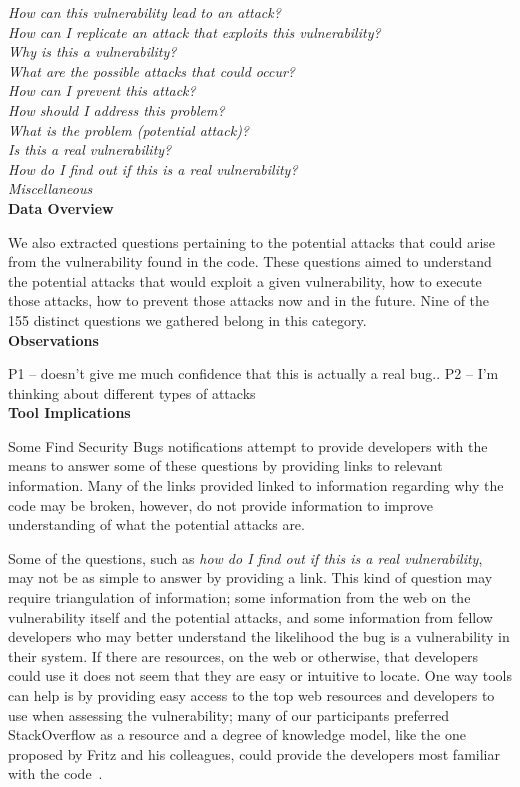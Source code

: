 \documentclass[conference]{IEEEtran}
\begin{document}
\noindent\emph{How can this vulnerability lead to an attack?} \\
\emph{How can I replicate an attack that exploits this vulnerability?} \\
\emph{Why is this a vulnerability?} \\
\emph{What are the possible attacks that could occur?} \\
\emph{How can I prevent this attack?} \\
\emph{How should I address this problem? } \\
\emph{What is the problem (potential attack)?} \\
\emph{Is this a real vulnerability?} \\
\emph{How do I find out if this is a real vulnerability?} \\
\emph{Miscellaneous} \\

\noindent\textbf{Data Overview}

We also extracted questions pertaining to the potential attacks that could arise from the vulnerability found in the code. 
These questions aimed to understand the potential attacks that would exploit a given vulnerability, how to execute those attacks, how to prevent those attacks now and in the future. 
Nine of the 155 distinct questions we gathered belong in this category.
\\

\noindent\textbf{Observations}

P1 -- doesn't give me much confidence that this is actually a real bug..
P2 -- I'm thinking about different types of attacks 
\\

\noindent\textbf{Tool Implications}

Some Find Security Bugs notifications attempt to provide developers with the means to answer some of these questions by providing links to relevant information. 
Many of the links provided linked to information regarding why the code may be broken, however, do not provide information to improve understanding of what the potential attacks are.  

Some of the questions, such as \textit{how do I find out if this is a real vulnerability}, may not be as simple to answer by providing a link. 
This kind of question may require triangulation of information; some information from the web on the vulnerability itself and the potential attacks, and some information from fellow developers who may better understand the likelihood the bug is a vulnerability in their system. 
If there are resources, on the web or otherwise, that developers could use it does not seem that they are easy or intuitive to locate. 
One way tools can help is by providing easy access to the top web resources and developers to use when assessing the vulnerability; many of our participants preferred StackOverflow as a resource and a degree of knowledge model, like the one proposed by Fritz and his colleagues, could provide the developers most familiar with the code~\cite{fritz2010degree}.
\end{document}
